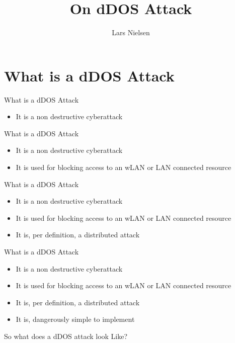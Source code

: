 \documentclass{beamer}
\title{On dDOS Attack}
\author{Lars Nielsen}
\begin{document}
\maketitle
\section{What is a dDOS Attack}
\begin{frame}{What is a dDOS Attack}
  \begin{itemize}
  \item It is a non destructive cyberattack
  \end{itemize}
\end{frame}
\begin{frame}[noframenumbering]{What is a dDOS Attack}
  \begin{itemize}
  \item It is a non destructive cyberattack
  \item It is used for blocking access to an wLAN or LAN connected resource
  \end{itemize}
\end{frame}
\begin{frame}[noframenumbering]{What is a dDOS Attack}
  \begin{itemize}
  \item It is a non destructive cyberattack
  \item It is used for blocking access to an wLAN or LAN connected resource
  \item It is, per definition, a distributed attack
  \end{itemize}
\end{frame}
\begin{frame}[noframenumbering]{What is a dDOS Attack}
  \begin{itemize}
  \item It is a non destructive cyberattack
  \item It is used for blocking access to an wLAN or LAN connected resource
  \item It is, per definition, a distributed attack
  \item It is, dangerously simple to implement
  \end{itemize}
\end{frame}
\begin{frame}
  \begin{center}
    So what does a dDOS attack look Like?
  \end{center}
\end{frame}
\end{document}
